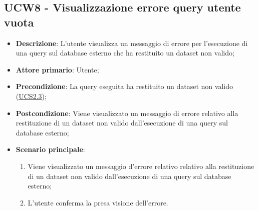 \subsection{UCW8 - Visualizzazione errore query utente vuota}
\label{sub:ucw8}
\begin{itemize}
    \item \textbf{Descrizione}: L'utente visualizza un messaggio di errore per l'esecuzione di una query sul database 
    esterno che ha restituito un dataset non valido;

    \item \textbf{Attore primario}: Utente;
    
    \item \textbf{Precondizione}:   La query eseguita ha restituito un dataset non valido 
    (\hyperref[ssub:ucs2.3]{UCS2.3});

    \item \textbf{Postcondizione}:   Viene visualizzato un messaggio di errore relativo alla restituzione di un dataset non valido dall'esecuzione di una query sul database esterno;
    
    \item \textbf{Scenario principale}:
    \begin{enumerate}
        \item Viene visualizzato un messaggio d'errore relativo relativo alla restituzione di un dataset non valido 
        dall'esecuzione di una query sul database esterno;
        \item L'utente conferma la presa visione dell'errore.
    \end{enumerate}

\end{itemize}